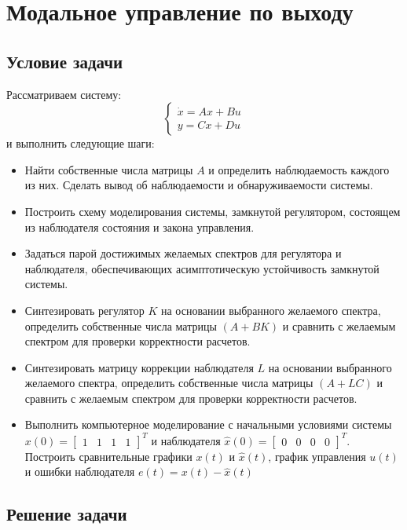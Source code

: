 \chapter{Модальное управление по выходу}
\label{ch:chap3}
\section{Условие задачи}

Рассматриваем систему:
$$
  \begin{cases}
    \dot{x} = Ax + Bu\\
    y = Cx + Du
  \end{cases}
$$ и выполнить следующие шаги:
  \begin{itemize}
  \item  Найти собственные числа матрицы $A$ и определить наблюдаемость каждого из них. 
   Сделать вывод об наблюдаемости и обнаруживаемости системы.
  \item  Построить схему моделирования системы, замкнутой регулятором, состоящем
    из наблюдателя состояния  и закона управления.
  \item  Задаться парой достижимых желаемых спектров для регулятора и наблюдателя,
  обеспечивающих асимптотическую устойчивость замкнутой системы.
  \item Синтезировать регулятор $K$ на основании выбранного желаемого спектра, определить
    собственные числа матрицы $(A+BK)$ и сравнить с желаемым спектром
  для проверки корректности расчетов.
  \item Синтезировать матрицу коррекции наблюдателя $L$ на основании выбранного желаемого спектра, 
  определить собственные числа матрицы $(A +LC)$ и сравнить с
  желаемым спектром для проверки корректности расчетов.
  \item  Выполнить компьютерное моделирование с начальными условиями системы 
  $x(0) = \begin{bmatrix} 1&1&1&1 \end{bmatrix}^T$ и наблюдателя $\hat{x}(0)=\begin{bmatrix}0 & 0& 0 &0\end{bmatrix}^T $.
  Построить  сравнительные графики $x(t)$ и $\hat{x}(t)$, график управления $u(t)$ и ошибки наблюдателя
   $e(t) = x(t) - \hat{x}(t)$
  \end{itemize}
      
\section{Решение задачи}

